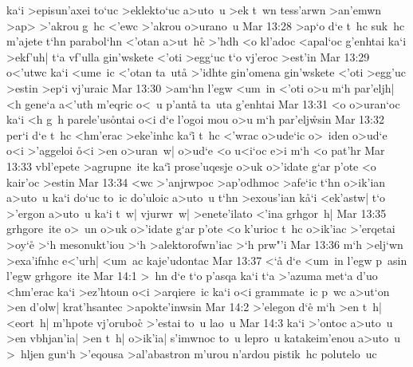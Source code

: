 ka`i
>episun'axei
to`uc
>eklekto`uc
a>uto~u
>ek
t~wn
tess'arwn
>an'emwn
>ap>
>'akrou
g~hc
<'ewc
>'akrou
o>urano~u\bibvsend
\vs Mar 13:28
>ap`o
d`e
t~hc
suk~hc
m'ajete
t`hn
parabol`hn
<'otan
a>ut~hc\r{}
>'hdh
<o
kl'adoc
<apal`oc
g'enhtai
ka`i
>ekf'uh|
t`a
vf'ulla
gin'wskete
<'oti
>egg`uc
t`o
vj'eroc
>est'in\bibvsend
\vs Mar 13:29
o<'utwc
ka`i
<ume~ic
<'otan
ta~uta\r{}
>'idhte
gin'omena
gin'wskete
<'oti
>egg'uc
>estin
>ep`i
vj'uraic\bibvsend
\vs Mar 13:30
>am`hn
l'egw
<um~in
<'oti
o>u
m`h
par'eljh|
<h
gene`a
a<'uth
m'eqric
o<~u
p'anta\r{}
ta~uta
g'enhtai\bibvsend
\vs Mar 13:31
<o
o>uran`oc
ka`i
<h
g~h
parele'us\r{o}ntai
o<i
d`e
l'ogoi
mou
o>u
m`h
par'elj\r{w}sin\bibvsend
{}
\vs Mar 13:32
per`i
d`e
t~hc
<hm'erac
>eke'inhc
ka`i\r{}
t~hc
<'wrac
o>ude`ic
o>~iden
o>ud`e
o<i
>'aggeloi
\r{o}<i
>en
o>uran~w|
o>ud`e
<o
u<i`oc
e>i
m`h
<o
pat'hr\bibvsend
\vs Mar 13:33
vbl'epete
>agrupne~ite
ka`i\r{}
prose'uqesje
o>uk
o>'idate
g`ar
p'ote
<o
kair'oc
>estin\bibvsend
\vs Mar 13:34
<wc
>'anjrwpoc
>ap'odhmoc
>afe`ic
t`hn
o>ik'ian
a>uto~u
ka`i
do`uc
to~ic
do'uloic
a>uto~u
t`hn
>exous'ian
k\r{a}`i
<ek'astw|
t`o
>'ergon
a>uto~u
ka`i
t~w|
vjurwr~w|
>enete'ilato
<'ina
grhgor~h|\bibvsend
\vs Mar 13:35
grhgore~ite
o>~un
o>uk
o>'idate
g`ar
p'ote
<o
k'urioc
t~hc
o>ik'iac
>'erqetai
>oy`e\r{}
>`h
mesonukt'iou
>`h
>alektorofwn'iac
>`h
prw"'i\bibvsend
\vs Mar 13:36
m`h
>elj`wn
>exa'ifnhc
e<'urh|
<um~ac
kaje'udontac\bibvsend
\vs Mar 13:37
<`a\r{}
d`e
<um~in
l'egw
p~asin
l'egw
grhgore~ite\bibvsend
\vs Mar 14:1
>~hn
d`e
t`o
p'asqa
ka`i
t`a
>'azuma
met`a
d'uo
<hm'erac
ka`i
>ez'htoun
o<i
>arqiere~ic
ka`i
o<i
grammate~ic
p~wc
a>ut`on
>en
d'olw|
krat'hsantec
>apokte'inwsin\bibvsend
\vs Mar 14:2
>'elegon
d`e\r{}
m`h
>en
t~h|
<eort~h|
m'hpote
vj'oruboc\r{}
>'estai
to~u
lao~u\bibvsend
\vs Mar 14:3
ka`i
>'ontoc
a>uto~u
>en
vbhjan'ia|
>en
t~h|
o>ik'ia|
s'imwnoc
to~u
lepro~u
katakeim'enou
a>uto~u
>~hljen
gun`h
>'eqousa
>al'abastron
m'urou
n'ardou
pistik~hc
polutelo~uc
